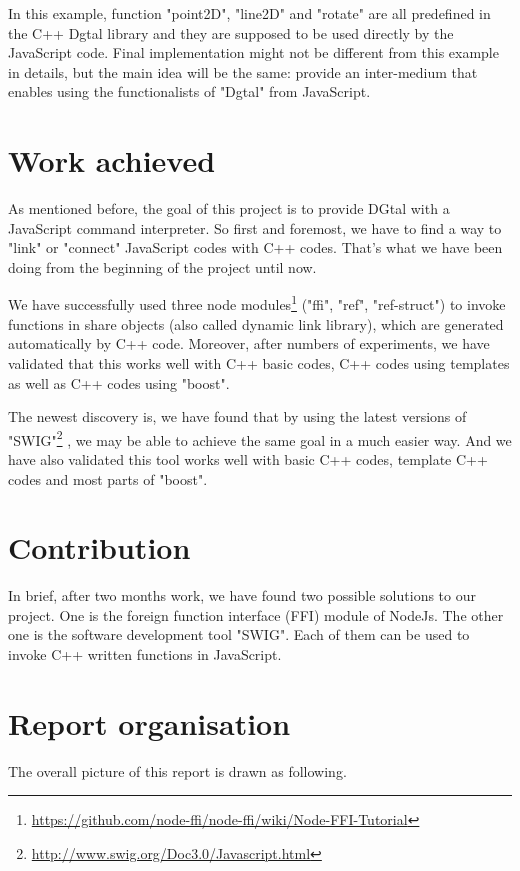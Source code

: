 In this example, function "point2D", "line2D" and "rotate" are all predefined in the C++ Dgtal library and they are supposed to be used directly by the JavaScript code. Final implementation might not be different from this example in details, but the main idea will be the same: provide an inter-medium that enables using the functionalists of "Dgtal" from JavaScript.

\section{Work achieved}

As mentioned before, the goal of this project is to provide DGtal with a JavaScript command interpreter. So first and foremost, we have to find a way to "link" or "connect" JavaScript codes with C++ codes. That's what we have been doing from the beginning of the project until now.

We have successfully used three node modules\footnote{\url{https://github.com/node-ffi/node-ffi/wiki/Node-FFI-Tutorial}} ("ffi", "ref", "ref-struct") to invoke functions in share objects (also called dynamic link library), which are generated automatically by C++ code. Moreover, after numbers of experiments, we have validated that this works well with C++ basic codes, C++ codes using templates as well as C++ codes using "boost".  

The newest discovery is, we have found that by using the latest versions of "SWIG"\footnote{\url{http://www.swig.org/Doc3.0/Javascript.html}} , we may be able to achieve the same goal in a much easier way. And we have also validated this tool works well with basic C++ codes, template C++ codes and most parts of "boost".

\section{Contribution}

In brief, after two months work, we have found two possible solutions to our project. One is the foreign function interface (FFI) module of NodeJs. The other one is the software development tool "SWIG". Each of them can be used to invoke C++ written functions in JavaScript.  

\section{Report organisation}

The overall picture of this report is drawn as following.

